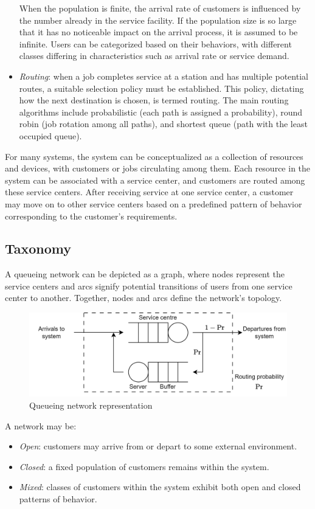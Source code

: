 \begin{itemize}
        When the population is finite, the arrival rate of customers is influenced by the number already in the service facility.
        If the population size is so large that it has no noticeable impact on the arrival process, it is assumed to be infinite. 
        Users can be categorized based on their behaviors, with different classes differing in characteristics such as arrival rate or service demand.
    \item \textit{Routing}: when a job completes service at a station and has multiple potential routes, a suitable selection policy must be established. 
        This policy, dictating how the next destination is chosen, is termed routing.
        The main routing algorithms include probabilistic (each path is assigned a probability), round robin (job rotation among all paths), and shortest queue (path with the least occupied queue).
\end{itemize}
For many systems, the system can be conceptualized as a collection of resources and devices, with customers or jobs circulating among them. 
Each resource in the system can be associated with a service center, and customers are routed among these service centers.
After receiving service at one service center, a customer may move on to other service centers based on a predefined pattern of behavior corresponding to the customer's requirements.

\subsection{Taxonomy}
A queueing network can be depicted as a graph, where nodes represent the service centers and arcs signify potential transitions of users from one service center to another.
Together, nodes and arcs define the network's topology.
\begin{figure}[H]
    \centering
    \includegraphics[width=0.65\linewidth]{images/per.png}
    \caption{Queueing network representation}
\end{figure}
A network may be:
\begin{itemize}
    \item \textit{Open}: customers may arrive from or depart to some external environment.
    \item \textit{Closed}: a fixed population of customers remains within the system.
    \item \textit{Mixed}: classes of customers within the system exhibit both open and closed patterns of behavior.
\end{itemize}

